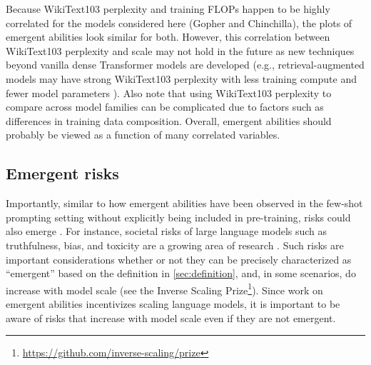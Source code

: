 \documentclass[10pt]{article} %
\begin{document}
Because WikiText103 perplexity and training FLOPs happen to be highly correlated for the models considered here (Gopher and Chinchilla), the plots of emergent abilities look similar for both.
However, this correlation between WikiText103 perplexity and scale may not hold in the future as new techniques beyond vanilla dense Transformer models are developed (e.g., retrieval-augmented models may have strong WikiText103 perplexity with less training compute and fewer model parameters \citep{borgeaud2021improving}).
Also note that using WikiText103 perplexity to compare across model families can be complicated due to factors such as differences in training data composition.
Overall, emergent abilities should probably be viewed as a function of many correlated variables.





\subsection{Emergent risks}\label{subsec:emergent-risks}
Importantly, similar to how emergent abilities have been observed in the few-shot prompting setting without explicitly being included in pre-training, risks could also emerge \citep{bommasani2021opportunities,jacobsrisks,ganguli2022predictability}.
For instance, societal risks of large language models such as truthfulness, bias, and toxicity are a growing area of research \citep{weidinger2021ethical}.
Such risks are important considerations whether or not they can be precisely characterized as ``emergent'' based on the definition in \cref{sec:definition}, and, in some scenarios, do increase with model scale (see the Inverse Scaling Prize\footnote{\url{https://github.com/inverse-scaling/prize}}).
Since work on emergent abilities incentivizes scaling language models, it is important to be aware of risks that increase with model scale even if they are not emergent. 
\end{document}
